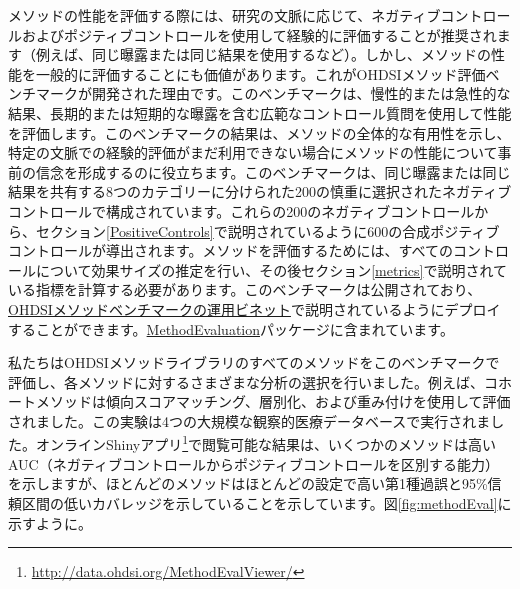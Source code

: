 \documentclass[
  11pt]{book}
\theoremstyle{definition}
\theoremstyle{definition}
\theoremstyle{definition}
\theoremstyle{definition}
\theoremstyle{remark}
\begin{document}
メソッドの性能を評価する際には、研究の文脈に応じて、ネガティブコントロールおよびポジティブコントロールを使用して経験的に評価することが推奨されます（例えば、同じ曝露または同じ結果を使用するなど）。しかし、メソッドの性能を一般的に評価することにも価値があります。これがOHDSIメソッド評価ベンチマークが開発された理由です。このベンチマークは、慢性的または急性的な結果、長期的または短期的な曝露を含む広範なコントロール質問を使用して性能を評価します。このベンチマークの結果は、メソッドの全体的な有用性を示し、特定の文脈での経験的評価がまだ利用できない場合にメソッドの性能について事前の信念を形成するのに役立ちます。このベンチマークは、同じ曝露または同じ結果を共有する8つのカテゴリーに分けられた200の慎重に選択されたネガティブコントロールで構成されています。これらの200のネガティブコントロールから、セクション\ref{PositiveControls}で説明されているように600の合成ポジティブコントロールが導出されます。メソッドを評価するためには、すべてのコントロールについて効果サイズの推定を行い、その後セクション\ref{metrics}で説明されている指標を計算する必要があります。このベンチマークは公開されており、\href{https://ohdsi.github.io/MethodEvaluation/articles/OhdsiMethodsBenchmark.html}{OHDSIメソッドベンチマークの運用ビネット}で説明されているようにデプロイすることができます。\href{https://ohdsi.github.io/MethodEvaluation/}{MethodEvaluation}パッケージに含まれています。

私たちはOHDSIメソッドライブラリのすべてのメソッドをこのベンチマークで評価し、各メソッドに対するさまざまな分析の選択を行いました。例えば、コホートメソッドは傾向スコアマッチング、層別化、および重み付けを使用して評価されました。この実験は4つの大規模な観察的医療データベースで実行されました。オンラインShinyアプリ\footnote{\url{http://data.ohdsi.org/MethodEvalViewer/}}で閲覧可能な結果は、いくつかのメソッドは高いAUC（ネガティブコントロールからポジティブコントロールを区別する能力）を示しますが、ほとんどのメソッドはほとんどの設定で高い第1種過誤と95\%信頼区間の低いカバレッジを示していることを示しています。図\ref{fig:methodEval}に示すように。
\end{document}
